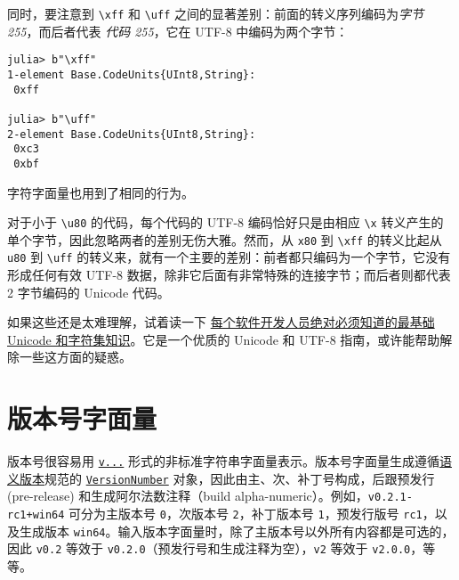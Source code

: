 同时，要注意到 \texttt{{\textbackslash}xff} 和 \texttt{{\textbackslash}uff} 之间的显著差别：前面的转义序列编码为\emph{字节 255}，而后者代表 \emph{代码 255}，它在 UTF-8 中编码为两个字节：




\begin{verbatim}
julia> b"\xff"
1-element Base.CodeUnits{UInt8,String}:
 0xff

julia> b"\uff"
2-element Base.CodeUnits{UInt8,String}:
 0xc3
 0xbf
\end{verbatim}



字符字面量也用到了相同的行为。



对于小于 \texttt{{\textbackslash}u80} 的代码，每个代码的 UTF-8 编码恰好只是由相应 \texttt{{\textbackslash}x} 转义产生的单个字节，因此忽略两者的差别无伤大雅。然而，从 \texttt{x80} 到 \texttt{{\textbackslash}xff} 的转义比起从 \texttt{u80} 到 \texttt{{\textbackslash}uff} 的转义来，就有一个主要的差别：前者都只编码为一个字节，它没有形成任何有效 UTF-8 数据，除非它后面有非常特殊的连接字节；而后者则都代表 2 字节编码的 Unicode 代码。



如果这些还是太难理解，试着读一下 \href{https://www.joelonsoftware.com/2003/10/08/the-absolute-minimum-every-software-developer-absolutely-positively-must-know-about-unicode-and-character-sets-no-excuses/}{{\textquotedbl}每个软件开发人员绝对必须知道的最基础 Unicode 和字符集知识{\textquotedbl}}。它是一个优质的 Unicode 和 UTF-8 指南，或许能帮助解除一些这方面的疑惑。



\hypertarget{10038787961375920908}{}


\section{版本号字面量}



版本号很容易用 \hyperlink{8914616188788850763}{\texttt{v{\textquotedbl}...{\textquotedbl}}} 形式的非标准字符串字面量表示。版本号字面量生成遵循\href{https://semver.org/}{语义版本}规范的 \hyperlink{16653194174751393225}{\texttt{VersionNumber}} 对象，因此由主、次、补丁号构成，后跟预发行 (pre-release) 和生成阿尔法数注释（build alpha-numeric）。例如，\texttt{v{\textquotedbl}0.2.1-rc1+win64{\textquotedbl}} 可分为主版本号 \texttt{0}，次版本号 \texttt{2}，补丁版本号 \texttt{1}，预发行版号 \texttt{rc1}，以及生成版本 \texttt{win64}。输入版本字面量时，除了主版本号以外所有内容都是可选的，因此 \texttt{v{\textquotedbl}0.2{\textquotedbl}} 等效于 \texttt{v{\textquotedbl}0.2.0{\textquotedbl}}（预发行号和生成注释为空），\texttt{v{\textquotedbl}2{\textquotedbl}} 等效于 \texttt{v{\textquotedbl}2.0.0{\textquotedbl}}，等等。




